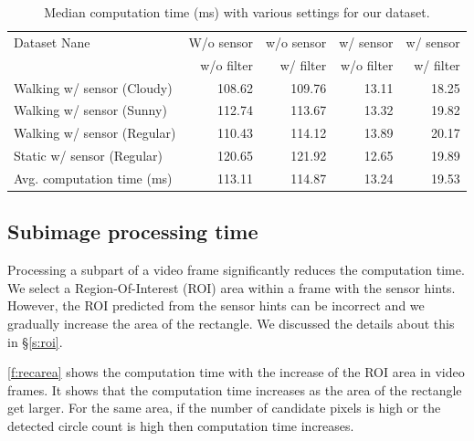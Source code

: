 \begin{table}[!ht]
  \centering
  
  \begin{tabular}{  l r r r r}
    \rowcolor{gray!50}
    Dataset Nane & W/o sensor & w/o sensor & w/ sensor  & w/ sensor \\
    \rowcolor{gray!50}
    & w/o filter & w/ filter & w/o filter & w/ filter\\
    \hline
    Walking w/ sensor (Cloudy) & 108.62 & 109.76 & 13.11 & 18.25 \\
    Walking w/ sensor (Sunny) & 112.74 & 113.67 & 13.32 & 19.82 \\
    Walking w/ sensor (Regular) & 110.43 & 114.12 & 13.89 & 20.17 \\
    Static w/ sensor (Regular) & 120.65 & 121.92 & 12.65 & 19.89\\
    \hline
    Avg. computation time (ms) & 113.11 & 114.87 & 13.24 & 19.53\\
    
  \end{tabular}
  \caption{Median computation time (ms) with various settings for our dataset.}
  \label{t:dataset_time}
\end{table}

\subsection{Subimage processing time}
Processing a subpart of a video frame significantly reduces the computation time. 
We select a Region-Of-Interest (ROI) area within a frame with the sensor hints.
However, the ROI predicted from the sensor hints can be incorrect and we gradually increase the area of the rectangle.
We discussed the details about this in \S\ref{s:roi}.


\ref{f:recarea} shows the computation time with the increase of the ROI area in video frames.
It shows that the computation time increases as the area of the rectangle get larger.
For the same area, if the number of candidate pixels is high or the detected circle count is high then computation time increases.

